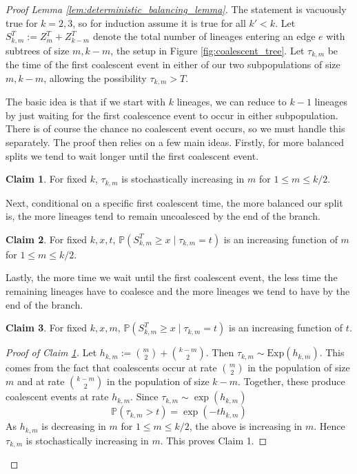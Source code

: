 \documentclass[10pt,oneside,reqno]{article}
\theoremstyle{plain}
\theoremstyle{definition}
\newtheorem{proofclaim}{Claim}
\numberwithin{equation}{section}
\renewcommand{\leq}{\leqslant}
\renewcommand{\geq}{\geqslant}
\renewcommand{\P}{\mathbb{P}}
\begin{document}
\begin{proof}[Proof Lemma \ref{lem:deterministic_balancing_lemma}]

 The statement is vacuously true for $k=2,3$, so for induction assume it is true for all $k' < k$. Let $S_{k,m}^T := Z_m^T + Z^T_{k-m}$ denote the total number of lineages entering an edge $e$ with subtrees of size $m,k-m$, the setup in Figure \ref{fig:coalescent_tree}. Let $\tau_{k,m}$ be the time of the first coalescent event in either of our two subpopulations of size $m,k-m$, allowing the possibility $\tau_{k,m} > T$.
  
  
  The basic idea is that if we start with $k$ lineages, we can reduce to $k-1$ lineages by just waiting for the first coalescence event to occur in either subpopulation. There is of course the chance no coalescent event occurs, so we must handle this separately. The proof then relies on a few main ideas. Firstly, for more balanced splits we tend to wait longer until the first coalescent event.
  \begin{proofclaim}
      For fixed $k$, $\tau_{k,m}$ is stochastically increasing in $m$ for $1 \leq m \leq k/2$.
      \label{claim:even_split_waits_longest_for_first_coalescent}
  \end{proofclaim}
  \noindent Next, conditional on a specific first coalescent time, the more balanced our split is, the more lineages tend to remain uncoalesced by the end of the branch.
  \begin{proofclaim}
      For fixed $k, x,t$, $\P(S_{k,m}^T \geq x \; | \; \tau_{k,m} = t)$ is an increasing function of $m$ for $1 \leq m \leq k/2$. 
\label{claim:cond_first_coalescent_even_split_dominates}
  \end{proofclaim}
  \noindent Lastly, the more time we wait until the first coalescent event, the less time the remaining lineages have to coalesce and the more lineages we tend to have by the end of the branch. 
  \begin{proofclaim}
      For fixed $k, x, m$, $\P(S_{k,m}^T \geq x \; | \; \tau_{k,m} = t)$ is an increasing function of $t$.
      \label{claim:more_time_to_coalesce_is_better}
  \end{proofclaim}
  \begin{proof}[Proof of Claim \ref{claim:even_split_waits_longest_for_first_coalescent}]
        Let $h_{k,m} := {m \choose 2} + {k-m \choose 2}$. Then $\tau_{k,m} \sim \mathrm{Exp}\left(h_{k,m}\right)$. This comes from the fact that coalescents occur at rate ${m \choose 2}$ in the population of size $m$ and at rate ${k-m \choose 2}$ in the population of size $k-m$. Together, these produce coalescent events at rate $h_{k,m}$. Since $\tau_{k,m} \sim \exp(h_{k,m})$
        \[\P(\tau_{k,m} > t) = \exp\left(-th_{k,m}\right)\]
        \noindent As $h_{k,m}$ is decreasing in $m$ for $1 \leq m \leq k/2$, the above is increasing in $m$. Hence $\tau_{k,m}$ is stochastically increasing  in $m$. This proves Claim 1.
  \end{proof}


\end{proof}
\end{document}
